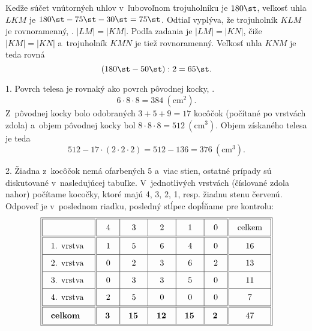 {%
Keďže súčet vnútorných uhlov v~ľubovoľnom trojuholníku je $180\st$,
veľkosť uhla $LKM$ je $180\st-75\st-30\st =75\st$.
Odtiaľ vyplýva, že trojuholník $KLM$ je rovnoramenný, \tj. $|LM| = |KM|$.
Podľa zadania je $|LM| = |KN|$, čiže $|KM|=|KN|$ a~trojuholník $KMN$ je
tiež rovnoramenný.
Veľkosť uhla $KNM$ je teda rovná
$$
(180\st-50\st):2 =65\st.
$$
}

{%
1.
Povrch telesa je rovnaký ako povrch pôvodnej kocky, \tj.
$$
6\cdot 8\cdot 8 = 384\ (\text{cm}^2).
$$
Z~pôvodnej kocky bolo odobraných $3 + 5 + 9 = 17$ kocôčok (počítané po
vrstvách zdola) a~objem pôvodnej kocky bol $8 \cdot 8 \cdot 8 = 512\ (\text{cm}^3)$.
Objem získaného telesa je teda
$$
512 - 17\cdot(2 \cdot 2 \cdot 2) = 512 -136 = 376\ (\text{cm}^3).
$$

2.
Žiadna z~kocôčok nemá ofarbených 5 a~viac stien,
ostatné prípady sú diskutované v~nasledujúcej tabuľke.
V~jednotlivých vrstvách (číslované zdola nahor) počítame kocočky, ktoré majú
4, 3, 2, 1, resp. žiadnu stenu červenú.
Odpoveď je v~poslednom riadku, posledný stĺpec dopĺňame pre kontrolu:
$$
\vbox{\bgroup\offinterlineskip
\def \vvrule{\vrule \kern 1.4pt \vrule}
\def \\{\crcr\omit\vvrule\hrulefill\vvrule&\multispan 5\hrulefill\vvrule&\omit\hrulefill\vvrule\cr}
\def \vkern{\multispan 7\vrule  height1.2pt \hfil \vrule }
\def\strut {\vrule  height13pt depth 7pt width0pt }
\halign  {
\vvrule \quad#\hfil\quad \vvrule &\quad\hfil#\hfil\quad\vrule &\quad\hfil#\hfil\quad\vrule &\quad\hfil#\hfil\quad\vrule &\quad\hfil#\hfil\quad\vrule &\quad\hfil#\hfil\quad \vvrule &\quad\hfil#\hfil\quad \vvrule\strut \cr
\noalign{\hrule} \vkern\\
&4&3&2&1&0&celkem\\
\vkern\\
1. vrstva &1&5&6&4&0&16\\
2. vrstva &0&2&3&6&2&13\\
3. vrstva &0&3&3&5&0&11\\
4. vrstva &2&5&0&0&0&7\\
\vkern\\
\bf celkom &\bf 3&\bf 15&\bf 12&\bf 15&\bf 2&47\\
\vkern\cr\noalign{\hrule}}
\egroup}
$$}

